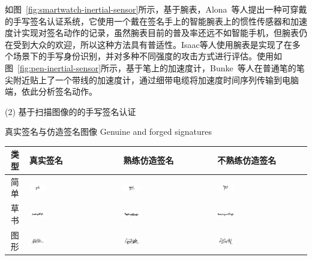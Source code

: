 如图~\ref{fig:smartwatch-inertial-sensor}所示，基于腕表，Alona~\cite{Levy2018Handwritten}等人提出一种可穿戴的手写签名认证系统，它使用一个戴在签名手上的智能腕表上的惯性传感器和加速度计实现对签名动作的记录，虽然腕表目前的普及率还远不如智能手机，但腕表仍在受到大众的欢迎，所以这种方法具有普适性。Isaac\cite{8698222}等人使用腕表是实现了在多个场景下的手写身份识别，并对多种不同强度的攻击方式进行评估。使用如图~\ref{fig:pen-inertial-sensor}所示，基于笔上的加速度计，Bunke~\cite{Bunke2015Online}等人在普通笔的笔尖附近贴上了一个带线的加速度计，通过细带电缆将加速度时间序列传输到电脑端，依此分析签名动作。

(2) 基于扫描图像的的手写签名认证
\begin{table}[!hpb]
  \centering
  \bicaption
    {真实签名与仿造签名图像}
    {Genuine and forged signatures}
  \label{tab:signatures-images}
  \begin{tabular}{|c|m{}|m{}|m{}|} \toprule 
    类型 & 真实签名 & 熟练仿造签名 & 不熟练仿造签名\\ \midrule
   简单& \includegraphics[width=0.2\textwidth]{figure/signature-1.png}&\includegraphics[width=0.2\textwidth]{figure/signature-2.png}&\includegraphics[width=0.2\textwidth]{figure/signature-3.png} \\ \midrule
    草书&\includegraphics[width=0.2\textwidth]{figure/signature-4.png}&\includegraphics[width=0.2\textwidth]{figure/signature-5.png}&\includegraphics[width=0.2\textwidth]{figure/signature-6.png} \\ \midrule
    图形&\includegraphics[width=0.2\textwidth]{figure/signature-7.png}&\includegraphics[width=0.2\textwidth]{figure/signature-8.png}&\includegraphics[width=0.2\textwidth]{figure/signature-9.png} \\ 

\end{tabular}
\end{table}
